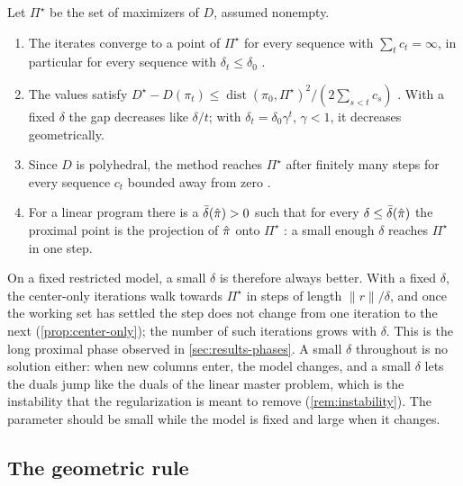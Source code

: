 \begin{remark} \label{rem:prox-theory}
Let $\Pi^\star$ be the set of maximizers of $D$, assumed nonempty.
\begin{enumerate}
    \item The iterates converge to a point of $\Pi^\star$ for every sequence with
          $\sum_t c_t = \infty$, in particular for every sequence with $\delta_t\le\delta_0$
          \cite{rockafellar1976monotone, guler1991convergence}.
    \item The values satisfy $D^\star - D(\pi_t)\le \operatorname{dist}(\pi_0,\Pi^\star)^2 /
          (2\sum_{s<t}c_s)$ \cite{guler1991convergence}. With a fixed $\delta$ the gap decreases
          like $\delta/t$; with $\delta_t = \delta_0\gamma^t$, $\gamma<1$, it decreases
          geometrically.
    \item Since $D$ is polyhedral, the method reaches $\Pi^\star$ after finitely many steps
          for every sequence $c_t$ bounded away from zero
          \cite{rockafellar1976monotone, ferris1991finite}.
    \item For a linear program there is a $\bar\delta(\hat{\pi})>0$ such that for every
          $\delta\le\bar\delta(\hat{\pi})$ the proximal point is the projection of $\hat{\pi}$ onto
          $\Pi^\star$ \cite{mangasarian1979nonlinear, friedlander2007exact}: a small enough
          $\delta$ reaches $\Pi^\star$ in one step.
\end{enumerate}
\end{remark}

On a fixed restricted model, a small $\delta$ is therefore always better. With a fixed
$\delta$, the center-only iterations walk towards $\Pi^\star$ in steps of length
$\lVert r\rVert/\delta$, and once the working set has settled the step does not change from
one iteration to the next (\cref{prop:center-only}); the number of such iterations grows
with $\delta$. This is the long proximal phase observed in \cref{sec:results-phases}. A small
$\delta$ throughout is no solution either: when new columns enter, the model changes, and a
small $\delta$ lets the duals jump like the duals of the linear master problem, which is the
instability that the regularization is meant to remove (\cref{rem:instability}). The
parameter should be small while the model is fixed and large when it changes.

\subsection{The geometric rule}

